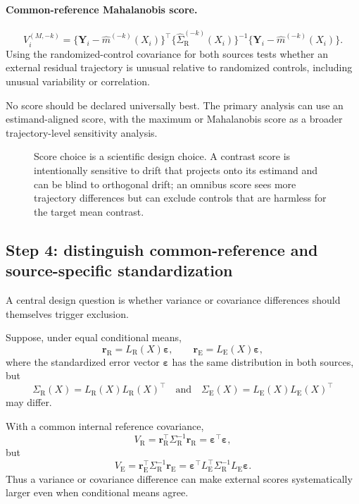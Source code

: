 \documentclass[11pt]{article}
\newcommand{\R}{\mathrm{R}}
\newcommand{\E}{\mathrm{E}}
\newcommand{\fullfig}[1]{\resizebox{\linewidth}{!}{}}
\begin{document}
\paragraph{Common-reference Mahalanobis score.}
\[
V_i^{(M,-k)}
=
\{\bm Y_i-\widehat m^{(-k)}(X_i)\}^{\top}
\{\widehat\Sigma_{\R}^{(-k)}(X_i)\}^{-1}
\{\bm Y_i-\widehat m^{(-k)}(X_i)\}.
\tag{5}
\]
Using the randomized-control covariance for both sources tests whether an external residual trajectory is unusual relative to randomized controls, including unusual variability or correlation.

No score should be declared universally best. The primary analysis can use an estimand-aligned score, with the maximum or Mahalanobis score as a broader trajectory-level sensitivity analysis.

\begin{figure}[!ht]
\centering
\fullfig{drift_score_alignment.tex}
\caption{Score choice is a scientific design choice. A contrast score is intentionally sensitive to drift that projects onto its estimand and can be blind to orthogonal drift; an omnibus score sees more trajectory differences but can exclude controls that are harmless for the target mean contrast.}
\label{fig:score-alignment}
\end{figure}

\subsection{Step 4: distinguish common-reference and source-specific standardization}

A central design question is whether variance or covariance differences should themselves trigger exclusion.

Suppose, under equal conditional means,
\[
\bm r_{\R}=L_{\R}(X)\bm\varepsilon,
\qquad
\bm r_{\E}=L_{\E}(X)\bm\varepsilon,
\tag{6}
\]
where the standardized error vector $\bm\varepsilon$ has the same distribution in both sources, but
\[
\Sigma_{\R}(X)=L_{\R}(X)L_{\R}(X)^{\top}
\quad\text{and}\quad
\Sigma_{\E}(X)=L_{\E}(X)L_{\E}(X)^{\top}
\]
may differ.

With a common internal reference covariance,
\[
V_{\R}=\bm r_{\R}^{\top}\Sigma_{\R}^{-1}\bm r_{\R}
=\bm\varepsilon^{\top}\bm\varepsilon,
\]
but
\[
V_{\E}=\bm r_{\E}^{\top}\Sigma_{\R}^{-1}\bm r_{\E}
=\bm\varepsilon^{\top}L_{\E}^{\top}\Sigma_{\R}^{-1}L_{\E}\bm\varepsilon.
\]
Thus a variance or covariance difference can make external scores systematically larger even when conditional means agree.
\end{document}
